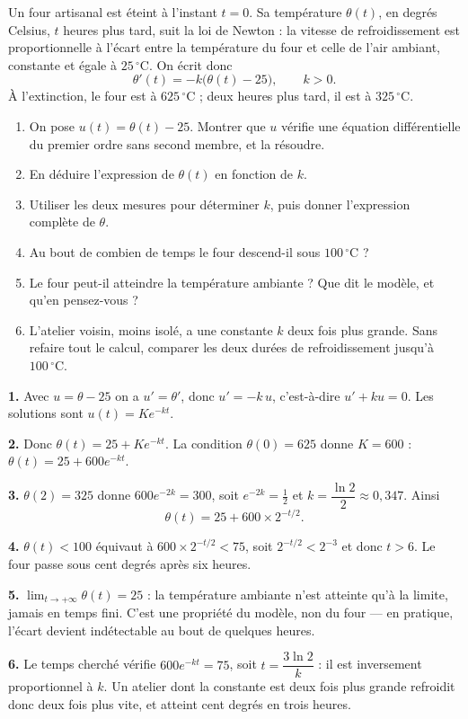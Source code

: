 \begin{jecherche}
Un four artisanal est éteint à l'instant $t = 0$. Sa température $\theta(t)$,
en degrés Celsius, $t$ heures plus tard, suit la loi de Newton : la vitesse de
refroidissement est proportionnelle à l'écart entre la température du four et
celle de l'air ambiant, constante et égale à $25\,^{\circ}$C. On écrit donc
\[
  \theta'(t) = -k\bigl(\theta(t) - 25\bigr), \qquad k>0 .
\]
À l'extinction, le four est à $625\,^{\circ}$C ; deux heures plus tard, il est
à $325\,^{\circ}$C.

\begin{enumerate}[label=\textbf{\arabic*.}, leftmargin=*, itemsep=0.3em]
  \item On pose $u(t) = \theta(t)-25$. Montrer que $u$ vérifie une équation
        différentielle du premier ordre sans second membre, et la résoudre.
  \item En déduire l'expression de $\theta(t)$ en fonction de $k$.
  \item Utiliser les deux mesures pour déterminer $k$, puis donner
        l'expression complète de $\theta$.
  \item Au bout de combien de temps le four descend-il sous $100\,^{\circ}$C ?
  \item Le four peut-il atteindre la température ambiante ? Que dit le modèle,
        et qu'en pensez-vous ?
  \item L'atelier voisin, moins isolé, a une constante $k$ deux fois plus
        grande. Sans refaire tout le calcul, comparer les deux durées de
        refroidissement jusqu'à $100\,^{\circ}$C.
\end{enumerate}
\end{jecherche}

\begin{corrige}
\textbf{1.} Avec $u = \theta-25$ on a $u' = \theta'$, donc
$u' = -k\,u$, c'est-à-dire $u'+ku = 0$. Les solutions sont
$u(t) = Ke^{-kt}$.

\textbf{2.} Donc $\theta(t) = 25 + Ke^{-kt}$. La condition $\theta(0) = 625$
donne $K = 600$ :
$\theta(t) = 25 + 600e^{-kt}$.

\textbf{3.} $\theta(2) = 325$ donne $600e^{-2k} = 300$, soit
$e^{-2k} = \tfrac12$ et $k = \dfrac{\ln 2}{2} \approx 0{,}347$. Ainsi
\[
  \theta(t) = 25 + 600 \times 2^{-t/2}.
\]

\textbf{4.} $\theta(t) < 100$ équivaut à $600 \times 2^{-t/2} < 75$, soit
$2^{-t/2} < 2^{-3}$ et donc $t > 6$. Le four passe sous cent degrés après six
heures.

\textbf{5.} $\lim_{t\to+\infty}\theta(t) = 25$ : la température ambiante n'est
atteinte qu'à la limite, jamais en temps fini. C'est une propriété du modèle,
non du four — en pratique, l'écart devient indétectable au bout de quelques
heures.

\textbf{6.} Le temps cherché vérifie $600e^{-kt} = 75$, soit
$t = \dfrac{3\ln 2}{k}$ : il est inversement proportionnel à $k$. Un atelier
dont la constante est deux fois plus grande refroidit donc deux fois plus
vite, et atteint cent degrés en trois heures.
\end{corrige}


